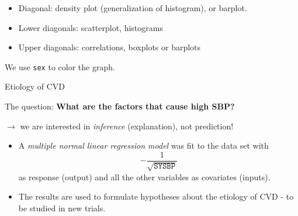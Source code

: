 \documentclass[
  10pt,
  ignorenonframetext,
]{beamer}
\providecommand{\tightlist}{%
  \setlength{\itemsep}{0pt}\setlength{\parskip}{0pt}}
\begin{document}
\begin{frame}[fragile]
\begin{itemize}
\tightlist
\item
  Diagonal: density plot (generalization of histogram), or barplot.
\item
  Lower diagonals: scatterplot, histograms
\item
  Upper diagonals: correlations, boxplots or barplots
\end{itemize}

\vspace{2mm}

We use \texttt{sex} to color the graph.
\end{frame}

\begin{frame}
\begin{block}{Etiology of CVD}
\protect\hypertarget{etiology-of-cvd}{}
\vspace{3mm}

The question: \textbf{What are the factors that cause high SBP?}

\vspace{2mm}

\(\rightarrow\) we are interested in \emph{inference} (explanation), not
prediction!

\vspace{4mm}

\begin{itemize}
\tightlist
\item
  A \emph{multiple normal linear regression model} was fit to the data
  set with \[-\frac{1}{\sqrt{\texttt{SYSBP}}}\] as response (output) and
  all the other variables as covariates (inputs).
\end{itemize}

\vspace{2mm}

\begin{itemize}
\tightlist
\item
  The results are used to formulate hypotheses about the etiology of CVD
  - to be studied in new trials.
\end{itemize}
\end{block}
\end{frame}
\end{document}

